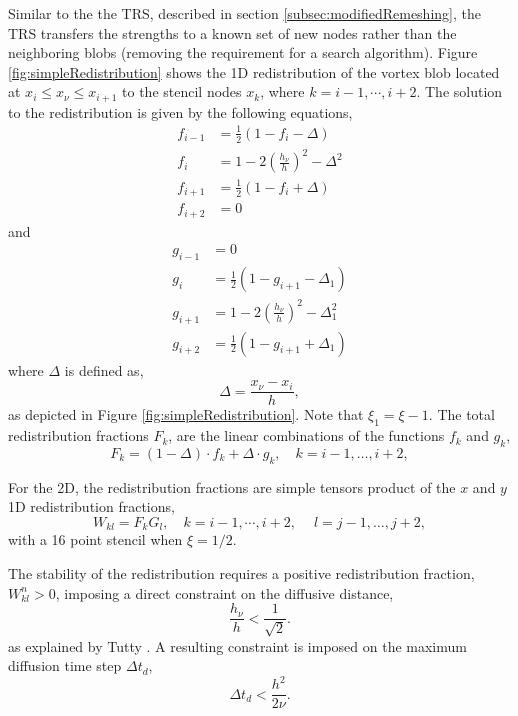 Similar to the the TRS, described in section \ref{subsec:modifiedRemeshing}, the TRS transfers the strengths to a known set of new nodes rather than the neighboring blobs (removing the requirement for a search algorithm). Figure \ref{fig:simpleRedistribution} shows the 1D redistribution of the vortex blob located at $x_i \leqslant x_{\nu} \leqslant x_{i+1}$ to the stencil nodes $x_k$, where $k=i-1,\cdots,i+2$. The solution to the redistribution is given by the following equations,
	\begin{subequations}
	\begin{align}
	f_{i-1} &= \frac{1}{2}\left(1-f_i-\Delta\right)\\
	f_i &= 1 - 2\left(\frac{h_{\nu}}{h}\right)^2 - \Delta^2\\
	f_{i+1} &= \frac{1}{2}\left(1-f_i+\Delta\right)\\
	f_{i+2} &= 0
	\end{align}
	\end{subequations}
and 	
	\begin{subequations}
	\begin{align}
	g_{i-1} &= 0\\
	g_{i} &= \frac{1}{2}\left(1-g_{i+1}-\Delta_1\right)\\
	g_{i+1} &= 1 - 2\left(\frac{h_{\nu}}{h}\right)^2 - \Delta_1^2\\
	g_{i+2} &= \frac{1}{2}\left(1-g_{i+1}+\Delta_1\right)
	\end{align}
	\end{subequations}
where $\Delta$ is defined as,
	\begin{equation}
	\Delta = \frac{x_{\nu}-x_i}{h},
	\end{equation}
as depicted in Figure \ref{fig:simpleRedistribution}. Note that $\xi_1 = \xi - 1$. The total redistribution fractions $F_k$, are the linear combinations of the functions $f_k$ and $g_k$,
	\begin{equation}
	F_k = \left(1-\Delta\right)\cdot f_k + \Delta\cdot g_k, \quad k = i-1,\dots,i+2,
	\end{equation}

For the 2D, the redistribution fractions are simple tensors product of the $x$ and $y$ 1D redistribution fractions,
	\begin{equation}
	W_{kl} = F_k G_l, \quad k = i-1,\cdots,i+2, \quad\ l = j-1,\dots,j+2,
	\end{equation}
with a 16 point stencil when $\xi=1/2$.

The stability of the redistribution requires a positive redistribution fraction, $W_{kl}^n > 0$, imposing a direct constraint on the diffusive distance,
	\begin{equation}
	\frac{h_{\nu}}{h} < \frac{1}{\sqrt{2}}.
	\end{equation}
as explained by Tutty \cite{Tutty2010a}. A resulting constraint is imposed on the maximum diffusion time step $\Delta t_d$,
	\begin{equation}
	\Delta t_d < \frac{h^2}{2\nu}.
	\label{eq:TRS_difftimeconstr}
	\end{equation}

